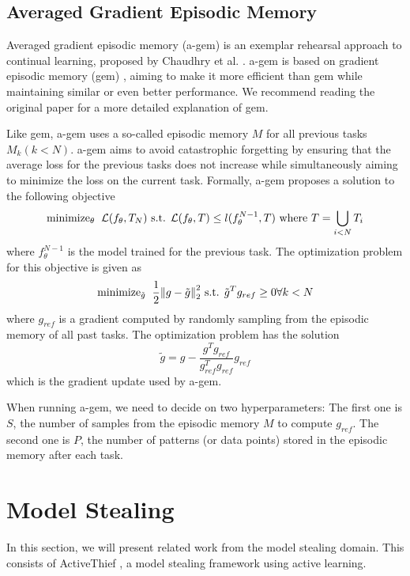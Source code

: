 \subsection{Averaged Gradient Episodic Memory}
\label{sec:Related_work:Continual_Learning:AGEM}
Averaged gradient episodic memory (\gls{a-gem}) is an exemplar rehearsal approach to continual learning, proposed by Chaudhry et al. \cite{chaudhry2018efficient}.
\gls{a-gem} is based on gradient episodic memory (\gls{gem}) \cite{lopez2017gradient}, aiming to make it more efficient than \gls{gem} while maintaining similar or
even better performance. We recommend reading the original paper for a more detailed explanation of \gls{gem}. \par
Like \gls{gem}, \gls{a-gem} uses a so-called episodic memory $M$ for all previous tasks $M_k (k<N)$. \gls{a-gem} aims to avoid catastrophic forgetting by ensuring
that the average loss for the previous tasks does not increase while simultaneously aiming to minimize the loss on the current task. Formally, \gls{a-gem} proposes
a solution to the following objective 
\begin{equation}
    \text{minimize}_\theta \hspace{0.2cm} \mathcal{L}(f_\theta,T_N) \text{ s.t. } \mathcal{L}(f_\theta,T) \leq l(f_\theta^{N-1},T) \text{ where } T = \bigcup_{i<N} T_i
\end{equation}
where $f_\theta^{N-1}$ is the model trained for the previous task. The optimization problem for this objective is given as
\begin{equation}
    \text{minimize}_{\tilde{g}} \hspace{0.2cm} \frac{1}{2} {\lVert g - \tilde{g} \rVert}^2_2 \text{ s.t. } \tilde{g}^T g_{ref} \geq 0 \forall k < N
\end{equation}
where $g_{ref}$ is a gradient computed by randomly sampling from the episodic memory of all past tasks. The optimization problem has the solution 
\begin{equation}
    \tilde{g} = g - \frac{g^T g_{ref}}{g^T_{ref} g_{ref}} g_{ref}
\end{equation}
which is the gradient update used by \gls{a-gem}. \par
When running \gls{a-gem}, we need to decide on two hyperparameters: The first one is $S$, the number of samples from the episodic memory $M$ to compute $g_{ref}$. The second
one is $P$, the number of patterns (or data points) stored in the episodic memory after each task.


\section{Model Stealing}
\label{sec:Related_work:Model_Stealing}
In this section, we will present related work from the model stealing domain. This consists of ActiveThief \cite{pal2020activethief}, a model stealing framework using
active learning.

